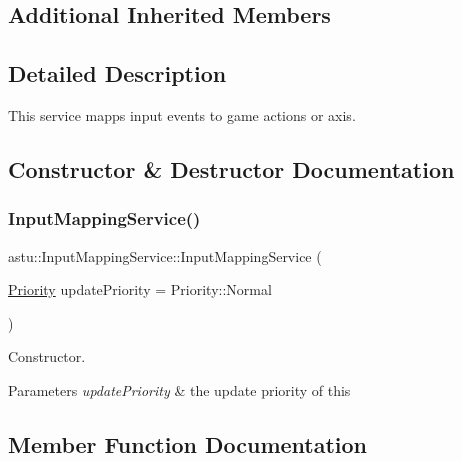 \subsection*{Additional Inherited Members}


\subsection{Detailed Description}
This service mapps input events to game actions or axis. 

\subsection{Constructor \& Destructor Documentation}
\mbox{\label{classastu_1_1InputMappingService_a0d099c093d399b34bde9e3baa2e7c3b8}} 
\subsubsection{\texorpdfstring{Input\+Mapping\+Service()}{InputMappingService()}}
{\footnotesize\ttfamily astu\+::\+Input\+Mapping\+Service\+::\+Input\+Mapping\+Service (\begin{DoxyParamCaption}\item[{\hyperlink{group__srv__group_gaf164c3f1c393e1f240458ae4fcd484a0}{Priority}}]{update\+Priority = {\ttfamily Priority\+:\+:Normal} }\end{DoxyParamCaption})}

Constructor.


\begin{DoxyParams}{Parameters}
{\em update\+Priority} & the update priority of this \\
\hline
\end{DoxyParams}


\subsection{Member Function Documentation}
\mbox{\label{classastu_1_1InputMappingService_adbb1babb001f3ec6477dd8b75440e0d0}} 
